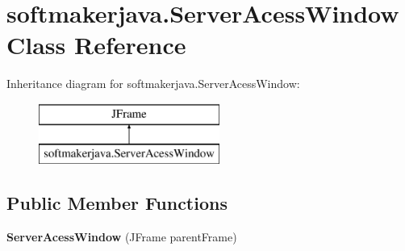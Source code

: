 \hypertarget{classsoftmakerjava_1_1_server_acess_window}{}\section{softmakerjava.\+Server\+Acess\+Window Class Reference}
\label{classsoftmakerjava_1_1_server_acess_window}
Inheritance diagram for softmakerjava.\+Server\+Acess\+Window\+:\begin{figure}[H]
\begin{center}
\leavevmode
\includegraphics[height=2.000000cm]{classsoftmakerjava_1_1_server_acess_window}
\end{center}
\end{figure}
\subsection*{Public Member Functions}
\begin{DoxyCompactItemize}
\item 
{\bfseries Server\+Acess\+Window} (J\+Frame parent\+Frame)\hypertarget{classsoftmakerjava_1_1_server_acess_window_ad5cb90a42f6cf9dcc29f0e9e7d341d15}{}\label{classsoftmakerjava_1_1_server_acess_window_ad5cb90a42f6cf9dcc29f0e9e7d341d15}

\end{DoxyCompactItemize}
